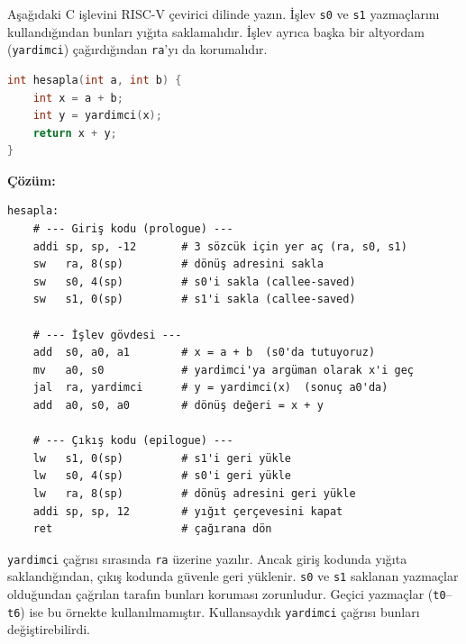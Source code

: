 \begin{ornek}[3.19]
\label{orn:prologue-epilogue}
Aşağıdaki C işlevini RISC-V çevirici dilinde yazın. İşlev \texttt{s0} ve \texttt{s1} yazmaçlarını kullandığından bunları yığıta saklamalıdır. İşlev ayrıca başka bir altyordam (\texttt{yardimci}) çağırdığından \texttt{ra}'yı da korumalıdır.
\begin{lstlisting}[language=C]
int hesapla(int a, int b) {
    int x = a + b;
    int y = yardimci(x);
    return x + y;
}
\end{lstlisting}

\textbf{Çözüm:}
\begin{lstlisting}[style=riscv]
hesapla:
    # --- Giriş kodu (prologue) ---
    addi sp, sp, -12       # 3 sözcük için yer aç (ra, s0, s1)
    sw   ra, 8(sp)         # dönüş adresini sakla
    sw   s0, 4(sp)         # s0'i sakla (callee-saved)
    sw   s1, 0(sp)         # s1'i sakla (callee-saved)

    # --- İşlev gövdesi ---
    add  s0, a0, a1        # x = a + b  (s0'da tutuyoruz)
    mv   a0, s0            # yardimci'ya argüman olarak x'i geç
    jal  ra, yardimci      # y = yardimci(x)  (sonuç a0'da)
    add  a0, s0, a0        # dönüş değeri = x + y

    # --- Çıkış kodu (epilogue) ---
    lw   s1, 0(sp)         # s1'i geri yükle
    lw   s0, 4(sp)         # s0'i geri yükle
    lw   ra, 8(sp)         # dönüş adresini geri yükle
    addi sp, sp, 12        # yığıt çerçevesini kapat
    ret                    # çağırana dön
\end{lstlisting}

\texttt{yardimci} çağrısı sırasında \texttt{ra} üzerine yazılır. Ancak giriş kodunda yığıta saklandığından, çıkış kodunda güvenle geri yüklenir. \texttt{s0} ve \texttt{s1} saklanan yazmaçlar olduğundan çağrılan tarafın bunları koruması zorunludur. Geçici yazmaçlar (\texttt{t0}--\texttt{t6}) ise bu örnekte kullanılmamıştır. Kullansaydık \texttt{yardimci} çağrısı bunları değiştirebilirdi.
\end{ornek}

